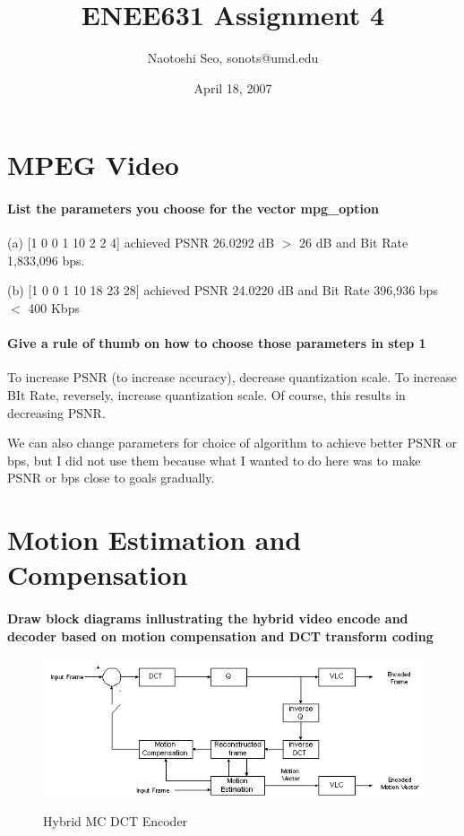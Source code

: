 \documentclass[article,oneside]{memoir}
\title {ENEE631 Assignment 4}
\author{Naotoshi Seo, sonots@umd.edu}
\date{April 18, 2007}
\begin{document}
\maketitle


\chapter{MPEG Video}

\subsubsection{List the parameters you choose for the vector mpg\_option}

\noindent (a) [1 0 0 1 10 2  2 4] achieved PSNR 26.0292 dB $ > $ 26 dB and Bit Rate 1,833,096 bps. 

\noindent (b) [1 0 0 1 10 18 23 28] achieved PSNR 24.0220 dB and Bit Rate 396,936 bps $<$ 400 Kbps

\subsubsection{Give a rule of thumb on how to choose those parameters in step 1}

To increase PSNR (to increase accuracy), decrease quantization scale. 
To increase BIt Rate, reversely, increase quantization scale. Of course, this results in decreasing PSNR. 

We can also change parameters for choice of algorithm to achieve better PSNR or bps, but I did not use them because what I wanted to do here was to make PSNR or bps close to goals gradually. 

\chapter{Motion Estimation and Compensation}

\subsubsection{Draw block diagrams inllustrating the hybrid video encode and decoder based on 
motion compensation and DCT transform coding}

\begin{center}
\begin{figure}[ht]
 \includegraphics[width=17cm]{../images/HybridMCDCTEncoder.png}\\
 \caption{Hybrid MC DCT Encoder}
\end{figure}
\end{center}
\end{document}

